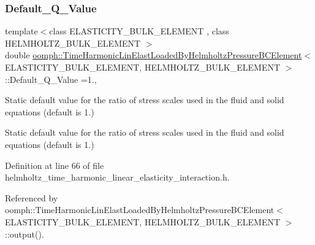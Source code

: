 \subsubsection{\texorpdfstring{Default\+\_\+\+Q\+\_\+\+Value}{Default\_Q\_Value}}
{\footnotesize\ttfamily template$<$class E\+L\+A\+S\+T\+I\+C\+I\+T\+Y\+\_\+\+B\+U\+L\+K\+\_\+\+E\+L\+E\+M\+E\+NT , class H\+E\+L\+M\+H\+O\+L\+T\+Z\+\_\+\+B\+U\+L\+K\+\_\+\+E\+L\+E\+M\+E\+NT $>$ \\
double \hyperlink{classoomph_1_1TimeHarmonicLinElastLoadedByHelmholtzPressureBCElement}{oomph\+::\+Time\+Harmonic\+Lin\+Elast\+Loaded\+By\+Helmholtz\+Pressure\+B\+C\+Element}$<$ E\+L\+A\+S\+T\+I\+C\+I\+T\+Y\+\_\+\+B\+U\+L\+K\+\_\+\+E\+L\+E\+M\+E\+NT, H\+E\+L\+M\+H\+O\+L\+T\+Z\+\_\+\+B\+U\+L\+K\+\_\+\+E\+L\+E\+M\+E\+NT $>$\+::Default\+\_\+\+Q\+\_\+\+Value =1.\hspace{0.3cm}{\ttfamily [static]}, {\ttfamily [protected]}}



Static default value for the ratio of stress scales used in the fluid and solid equations (default is 1.) 

Static default value for the ratio of stress scales used in the fluid and solid equations (default is 1.) 

Definition at line 66 of file helmholtz\+\_\+time\+\_\+harmonic\+\_\+linear\+\_\+elasticity\+\_\+interaction.\+h.



Referenced by oomph\+::\+Time\+Harmonic\+Lin\+Elast\+Loaded\+By\+Helmholtz\+Pressure\+B\+C\+Element$<$ E\+L\+A\+S\+T\+I\+C\+I\+T\+Y\+\_\+\+B\+U\+L\+K\+\_\+\+E\+L\+E\+M\+E\+N\+T, H\+E\+L\+M\+H\+O\+L\+T\+Z\+\_\+\+B\+U\+L\+K\+\_\+\+E\+L\+E\+M\+E\+N\+T $>$\+::output().

\mbox{\label{classoomph_1_1TimeHarmonicLinElastLoadedByHelmholtzPressureBCElement_ae5d333e308981db0bd733cbaa139a538}} 
